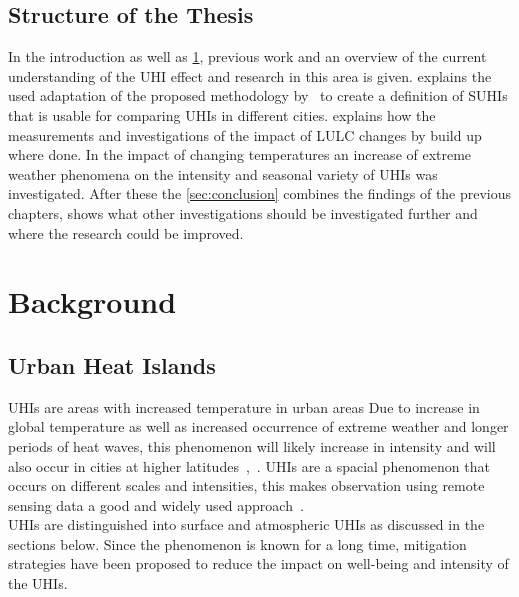 \documentclass[12pt,a4paper, english]{article}
\begin{document}
  \subsection{Structure of the Thesis}\label{ssec:structure} 
    In the introduction as well as \cref{sec:background}, previous work and an overview of the current understanding of the \gls{UHI} effect and research in this area is given. 
     explains the used adaptation of the proposed methodology by~\autocite{Sobrino2020} to create a definition of \glspl{SUHI} that is usable for comparing \glspl{UHI} in different cities.  
     explains how the measurements  and investigations of the impact of \gls{LULC} changes by build up where done.
    In  the impact of changing temperatures an increase of extreme weather phenomena on the intensity and seasonal variety of \glspl{UHI} was investigated. 
    After these the \cref{sec:conclusion} combines the findings of the previous chapters, shows what other investigations should be investigated further and where the research could be improved. 
%
\newpage
\section{Background}\label{sec:background}
  \subsection{Urban Heat Islands}
    \glspl{UHI} are areas with increased temperature in urban areas
    Due to increase in global temperature as well as increased occurrence of extreme weather and longer periods of heat waves, this phenomenon will likely increase in intensity and will also occur in cities at higher latitudes~\autocite{Sachindra2016},~\autocite[p.~904]{Wilby2008}.
    \glspl{UHI} are a spacial phenomenon that occurs on different scales and intensities, this makes observation using remote sensing data a good and widely used approach~\autocite{Weng2003}.\\
    \glspl{UHI} are distinguished into surface and atmospheric \glspl{UHI} as discussed in the sections below. 
    Since the phenomenon is known for a long time, mitigation strategies have been proposed to reduce the impact on well-being and intensity of the \glspl{UHI}.
%
\end{document}
